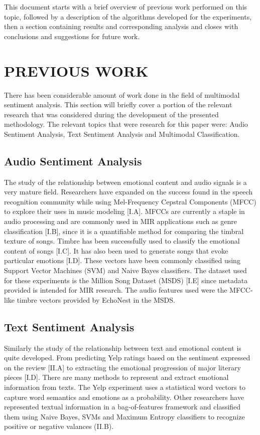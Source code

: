  This document starts with a brief overview of previous work performed on this 
 topic, followed by a description of the algorithms developed for the experiments, 
 then a section containing results and corresponding analysis and closes 
 with conclusions and suggestions for future work.
 
 \chapter{PREVIOUS WORK}

There has been considerable amount of work done in the field of multimodal 
sentiment analysis. This section will briefly cover a portion of the relevant 
research that was considered during the development of the presented 
methodology. The relevant topics that were research for this paper were: Audio Sentiment 
Analysis, Text Sentiment Analysis and Multimodal Classification.


\section{Audio Sentiment Analysis}

The study of the relationship between emotional content and audio signals is a 
very mature field. Researchers have expanded on the success found in the 
speech recognition community while using Mel-Frequency Cepstral Components 
(MFCC) to explore their uses in music modeling [I.A]. MFCCs are currently a 
staple in audio processing and are commonly used in MIR applications such 
as genre classification [I.B], since it is a quantifiable method for comparing the 
timbral texture of songs. Timbre has been successfully used to classify the 
emotional content of songs [I.C]. It has also been used to generate 
songs that evoke particular emotions [I.D].  These vectors have been commonly 
classified using Support Vector Machines (SVM) and Naive Bayes classifiers. The 
dataset used for these experiments is the Million Song Dataset (MSDS) [I.E] 
since metadata provided is intended for MIR research. The audio features 
used were the MFCC-like timbre vectors provided by EchoNest in the MSDS. 

\section{Text Sentiment Analysis}

Similarly the study of the relationship between text and emotional content is quite 
developed. From predicting Yelp ratings based on the sentiment expressed on the 
review [II.A]  to extracting the emotional progression of major literary pieces [I.D].  
There are many methods to represent and extract emotional information from texts. 
The Yelp experiment uses a statistical word vectors to capture word semantics and 
emotions as a probability.  Other researchers have represented textual information in 
a bag-of-features framework and classified them using Naive Bayes, SVMs and 
Maximum Entropy classifiers to recognize positive or negative valances (II.B).  

